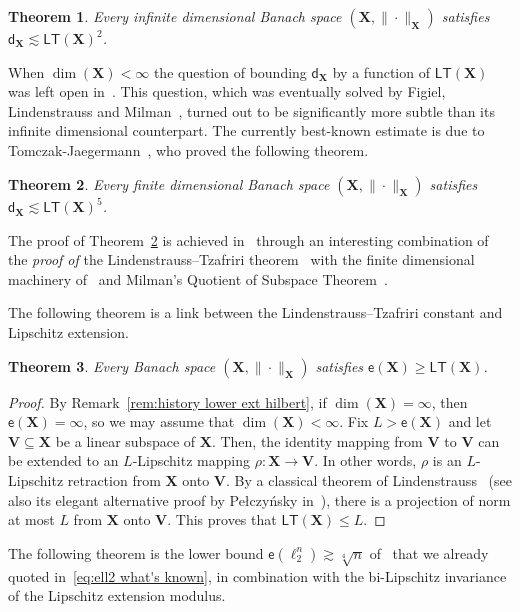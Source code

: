 \documentclass[11pt,reqno]{amsart}
\renewcommand{\le}{\leqslant}
\renewcommand{\ge}{\geqslant}
\newcommand{\dd}{\mathsf{d}}
\newcommand{\X}{\mathbf X}
\newtheorem{theorem}{Theorem}
\theoremstyle{remark}
\renewcommand{\subset}{\subseteq}
\newcommand{\ee}{\mathsf{e}}
\newcommand{\bfV}{\mathbf{V}}
\renewcommand{\1}{\mathbf 1}
\newcommand{\LT}{\mathsf{LT}}
\begin{document}
\begin{theorem}\label{thm:LT infinite dim} Every infinite dimensional Banach space $(\X,\|\cdot\|_{\X})$ satisfies $\dd_{\X}\lesssim \LT(\X)^2$.
\end{theorem}
When $\dim(\X)<\infty$ the question of bounding $\dd_{\X}$ by a function of $\LT(\X)$ was left open in~\cite{LT71}. This question, which was eventually solved by Figiel, Lindenstrauss and Milman~\cite[Theorem~6.7]{FLM77}, turned out to be significantly more subtle than its infinite dimensional counterpart. The currently best-known estimate is due to Tomczak-Jaegermann~\cite[Theorem~29.4]{Tom89}, who proved the following theorem.
\begin{theorem}\label{thm:TJ}
Every finite dimensional Banach space $(\X,\|\cdot\|_{\X})$ satisfies $ \dd_{\X}\lesssim \LT(\X)^5$.
\end{theorem}
The proof of Theorem~\ref{thm:TJ} is achieved in~\cite{Tom89} through an interesting combination of the {\em proof of} the Lindenstrauss--Tzafriri theorem~\cite{LT71} with the finite dimensional machinery of~\cite{FLM77} and Milman's Quotient of Subspace Theorem~\cite{Mil85}.

The following theorem is a link between the Lindenstrauss--Tzafriri constant and Lipschitz extension.




\begin{theorem}\label{thm:lin projections}
Every Banach space $(\X,\|\cdot\|_{\X})$ satisfies $\ee(\X)\ge \LT(\X)$.
\end{theorem}

\begin{proof} By Remark~\ref{rem:history lower ext hilbert}, if $\dim(\X)=\infty$, then $\ee(\X)=\infty$, so we may assume that $\dim(\X)<\infty$. Fix $L>\ee(\X)$ and let $\bfV\subset \X$ be a linear subspace of $\X$. Then, the identity mapping from $\bfV$ to $\bfV$ can be extended to an $L$-Lipschitz mapping $\rho:\X\to \bfV$. In other words, $\rho$ is an $L$-Lipschitz retraction from $\X$ onto $\bfV$. By  a classical theorem of Lindenstrauss~\cite{Lin64} (see also its  elegant alternative proof by Pe\l czy\'nsky in~\cite[page~61]{Pel68}), there is a projection of norm at most  $L$ from $\X$ onto $\bfV$. This proves  that $\LT(\X)\le L$.
\end{proof}


The following theorem is the lower bound $\ee(\ell_2^n)\gtrsim \sqrt[4]{n}$ of~\cite{MN13-bary} that we already quoted in~\eqref{eq:ell2 what's known}, in combination with the bi-Lipschitz invariance of the Lipschitz extension modulus.
\end{document}
